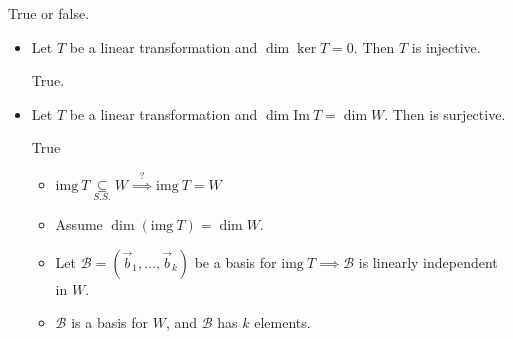 \documentclass[11pt,fleqn]{book} %
\begin{document}
\begin{example}
    True or false. 
    
    \begin{itemize}
        \item Let $T$ be a linear transformation and $\dim \ker T = 0$. Then $T$ is injective. 

        True. 
        
        \item Let $T$ be a linear transformation and $\dim \mathrm{Im}~T = \dim W$. Then  is surjective. 
        
        True
        \begin{itemize}
            \item $\mathrm{img}~T \underset{S.S.}{\subseteq} W \overset{?}{\implies} \mathrm{img}~T = W$
            \item Assume $\dim\left( \mathrm{img}~T \right) = \dim W$. 
            \item Let $\mathcal{B} = \left( \vec{b}_1, \dots, \vec{b}_k \right)$ be a basis for $\mathrm{img}~T \implies \mathcal{B}$ is linearly independent in $W$. 
            \item $\mathcal{B}$ is a basis for $W$, and $\mathcal{B}$ has $k$ elements. 
        \end{itemize}
    \end{itemize}
\end{example}
\end{document}
